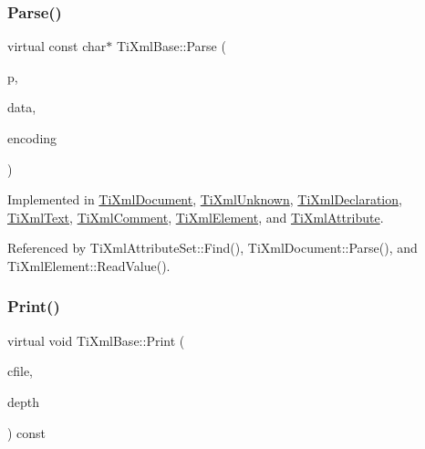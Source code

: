 \hypertarget{class_ti_xml_base_a00e4edb0219d00a1379c856e5a1d2025}{}\label{class_ti_xml_base_a00e4edb0219d00a1379c856e5a1d2025} 
\subsubsection{\texorpdfstring{Parse()}{Parse()}}
{\footnotesize\ttfamily virtual const char$\ast$ Ti\+Xml\+Base\+::\+Parse (\begin{DoxyParamCaption}\item[{const char $\ast$}]{p,  }\item[{\hyperlink{class_ti_xml_parsing_data}{Ti\+Xml\+Parsing\+Data} $\ast$}]{data,  }\item[{\hyperlink{tinyxml_8h_a88d51847a13ee0f4b4d320d03d2c4d96}{Ti\+Xml\+Encoding}}]{encoding }\end{DoxyParamCaption})\hspace{0.3cm}{\ttfamily [pure virtual]}}



Implemented in \hyperlink{class_ti_xml_document_a789ad2f06f93d52bdb5570b2f3670289}{Ti\+Xml\+Document}, \hyperlink{class_ti_xml_unknown_aa51c2694e4177b5f0b5429ee5a81b58d}{Ti\+Xml\+Unknown}, \hyperlink{class_ti_xml_declaration_a9839ea97ed687a2b7342fd7b0f04361b}{Ti\+Xml\+Declaration}, \hyperlink{class_ti_xml_text_a8d2dcfa41fc73d3e62dacc2fcf633819}{Ti\+Xml\+Text}, \hyperlink{class_ti_xml_comment_a43bddc18ac057734b41d84653b71d3e0}{Ti\+Xml\+Comment}, \hyperlink{class_ti_xml_element_af95c9165159fd9dfdcc5b894a3fcf85b}{Ti\+Xml\+Element}, and \hyperlink{class_ti_xml_attribute_ad62774421b814894b995af3b5d231dda}{Ti\+Xml\+Attribute}.



Referenced by Ti\+Xml\+Attribute\+Set\+::\+Find(), Ti\+Xml\+Document\+::\+Parse(), and Ti\+Xml\+Element\+::\+Read\+Value().

\hypertarget{class_ti_xml_base_a0de56b3f2ef14c65091a3b916437b512}{}\label{class_ti_xml_base_a0de56b3f2ef14c65091a3b916437b512} 
\subsubsection{\texorpdfstring{Print()}{Print()}}
{\footnotesize\ttfamily virtual void Ti\+Xml\+Base\+::\+Print (\begin{DoxyParamCaption}\item[{F\+I\+LE $\ast$}]{cfile,  }\item[{int}]{depth }\end{DoxyParamCaption}) const\hspace{0.3cm}{\ttfamily [pure virtual]}}

